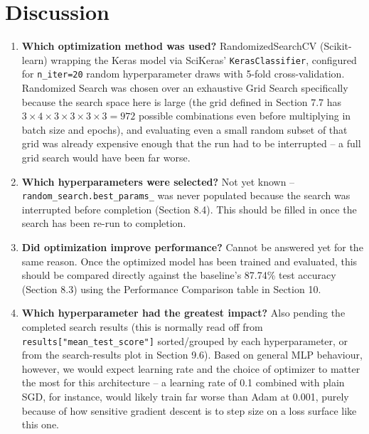 \documentclass[11pt]{article}
\begin{document}
\section{Discussion}
\begin{enumerate}[label=\arabic*.]
    \item \textbf{Which optimization method was used?} RandomizedSearchCV (Scikit-learn) wrapping the Keras model via SciKeras' \texttt{KerasClassifier}, configured for \texttt{n\_iter=20} random hyperparameter draws with 5-fold cross-validation. Randomized Search was chosen over an exhaustive Grid Search specifically because the search space here is large (the grid defined in Section 7.7 has $3 \times 4 \times 3 \times 3 \times 3 \times 3 = 972$ possible combinations even before multiplying in batch size and epochs), and evaluating even a small random subset of that grid was already expensive enough that the run had to be interrupted -- a full grid search would have been far worse.

    \item \textbf{Which hyperparameters were selected?} Not yet known -- \texttt{random\_search.best\_params\_} was never populated because the search was interrupted before completion (Section 8.4). This should be filled in once the search has been re-run to completion.

    \item \textbf{Did optimization improve performance?} Cannot be answered yet for the same reason. Once the optimized model has been trained and evaluated, this should be compared directly against the baseline's 87.74\% test accuracy (Section 8.3) using the Performance Comparison table in Section 10.

    \item \textbf{Which hyperparameter had the greatest impact?} Also pending the completed search results (this is normally read off from \texttt{results["mean\_test\_score"]} sorted/grouped by each hyperparameter, or from the search-results plot in Section 9.6). Based on general MLP behaviour, however, we would expect learning rate and the choice of optimizer to matter the most for this architecture -- a learning rate of 0.1 combined with plain SGD, for instance, would likely train far worse than Adam at 0.001, purely because of how sensitive gradient descent is to step size on a loss surface like this one.


\end{enumerate}
\end{document}
